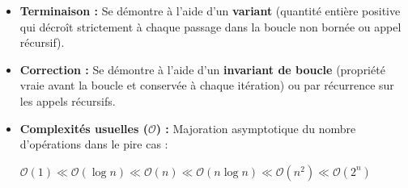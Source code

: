 \documentclass[11pt,a4paper]{article}
\begin{document}
	\begin{tcolorbox}[left=0cm,title=\bf{\faPython \; Mémo Algorithmique : Terminaison, Correction, Complexité},colbacktitle=cfond]
		\begin{itemize}
			\item[\textbullet] \textbf{Terminaison :} Se démontre à l'aide d'un \textbf{variant} (quantité entière positive qui décroît strictement à chaque passage dans la boucle non bornée ou appel récursif).
			\item[\textbullet] \textbf{Correction :} Se démontre à l'aide d'un \textbf{invariant de boucle} (propriété vraie avant la boucle et conservée à chaque itération) ou par récurrence sur les appels récursifs.
			\item[\textbullet] \textbf{Complexités usuelles ($\mathcal{O}$) :} Majoration asymptotique du nombre d'opérations dans le pire cas :
			\begin{center}
			$\mathcal{O}(1) \ll \mathcal{O}(\log n) \ll \mathcal{O}(n) \ll \mathcal{O}(n\log n) \ll \mathcal{O}(n^2) \ll \mathcal{O}(2^n)$
			\end{center}
		\end{itemize}
	\end{tcolorbox}
\end{document}
